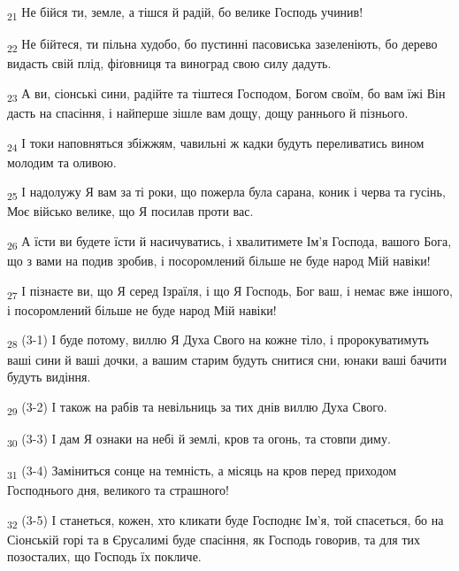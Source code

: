 \begin{tcolorbox}
\textsubscript{21} Не бійся ти, земле, а тішся й радій, бо велике Господь учинив!
\end{tcolorbox}
\begin{tcolorbox}
\textsubscript{22} Не бійтеся, ти пільна худобо, бо пустинні пасовиська зазеленіють, бо дерево видасть свій плід, фіґовниця та виноград свою силу дадуть.
\end{tcolorbox}
\begin{tcolorbox}
\textsubscript{23} А ви, сіонські сини, радійте та тіштеся Господом, Богом своїм, бо вам їжі Він дасть на спасіння, і найперше зішле вам дощу, дощу раннього й пізнього.
\end{tcolorbox}
\begin{tcolorbox}
\textsubscript{24} І токи наповняться збіжжям, чавильні ж кадки будуть переливатись вином молодим та оливою.
\end{tcolorbox}
\begin{tcolorbox}
\textsubscript{25} І надолужу Я вам за ті роки, що пожерла була сарана, коник і черва та гусінь, Моє військо велике, що Я посилав проти вас.
\end{tcolorbox}
\begin{tcolorbox}
\textsubscript{26} А їсти ви будете їсти й насичуватись, і хвалитимете Ім'я Господа, вашого Бога, що з вами на подив зробив, і посоромлений більше не буде народ Мій навіки!
\end{tcolorbox}
\begin{tcolorbox}
\textsubscript{27} І пізнаєте ви, що Я серед Ізраїля, і що Я Господь, Бог ваш, і немає вже іншого, і посоромлений більше не буде народ Мій навіки!
\end{tcolorbox}
\begin{tcolorbox}
\textsubscript{28} (3-1) І буде потому, виллю Я Духа Свого на кожне тіло, і пророкуватимуть ваші сини й ваші дочки, а вашим старим будуть снитися сни, юнаки ваші бачити будуть видіння.
\end{tcolorbox}
\begin{tcolorbox}
\textsubscript{29} (3-2) І також на рабів та невільниць за тих днів виллю Духа Свого.
\end{tcolorbox}
\begin{tcolorbox}
\textsubscript{30} (3-3) І дам Я ознаки на небі й землі, кров та огонь, та стовпи диму.
\end{tcolorbox}
\begin{tcolorbox}
\textsubscript{31} (3-4) Заміниться сонце на темність, а місяць на кров перед приходом Господнього дня, великого та страшного!
\end{tcolorbox}
\begin{tcolorbox}
\textsubscript{32} (3-5) І станеться, кожен, хто кликати буде Господнє Ім'я, той спасеться, бо на Сіонській горі та в Єрусалимі буде спасіння, як Господь говорив, та для тих позосталих, що Господь їх покличе.
\end{tcolorbox}
